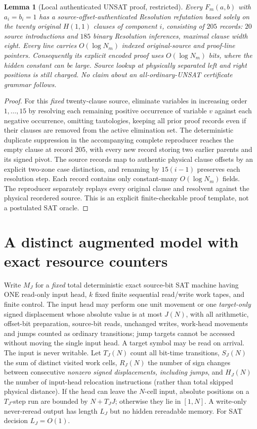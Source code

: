 \documentclass[11pt]{article}
\newtheorem{lemma}[theorem]{Lemma}
\begin{document}
\begin{lemma}[Local authenticated UNSAT proof, restricted]\label{lem:local}
Every $F_m(a,b)$ with $a_i=b_i=1$ has a source-offset-authenticated Resolution refutation based solely on the twenty original $H(1,1)$ clauses of component $i$, consisting of $205$ records: $20$ source introductions and $185$ binary Resolution inferences, maximal clause width eight. Every line carries $O(\log N_m)$ indexed original-source and proof-line pointers. Consequently its explicit encoded proof uses $O(\log N_m)$ bits, where the hidden constant can be large. Source lookup at physically separated left and right positions is still charged. No claim about an all-ordinary-UNSAT certificate grammar follows.
\end{lemma}
\begin{proof}
For this \emph{fixed} twenty-clause source, eliminate variables in increasing order $1,\ldots,15$ by resolving each remaining positive occurrence of variable $v$ against each negative occurrence, omitting tautologies, keeping all prior proof records even if their clauses are removed from the active elimination set. The deterministic duplicate suppression in the accompanying complete reproducer reaches the empty clause at record 205, with every new record storing two earlier parents and its signed pivot. The source records map to authentic physical clause offsets by an explicit two-zone case distinction, and renaming by $15(i-1)$ preserves each resolution step. Each record contains only constant-many $O(\log N_m)$ fields. The reproducer separately replays every original clause and resolvent against the physical reordered source. This is an explicit finite-checkable proof template, not a postulated SAT oracle.\end{proof}

\section{A distinct augmented model with exact resource counters}
Write $M_J$ for a \emph{fixed} total deterministic exact source-bit SAT machine having ONE read-only input head, $k$ fixed finite sequential read/write work tapes, and finite control. The input head may perform one unit movement or one \emph{target-only} signed displacement whose absolute value is at most $J(N)$, with all arithmetic, offset-bit preparation, source-bit reads, unchanged writes, work-head movements and jumps counted as ordinary transitions; jump targets cannot be accessed without moving the single input head. A target symbol may be read on arrival. The input is never writable. Let $T_J(N)$ count all bit-time transitions, $S_J(N)$ the sum of distinct visited work cells, $R_J(N)$ the number of sign changes between consecutive \emph{nonzero signed displacements, including jumps}, and $H_J(N)$ the number of input-head relocation instructions (rather than total skipped physical distance). If the head can leave the $N$-cell input, absolute positions on a $T_J$-step run are bounded by $N+T_JJ$; otherwise they lie in $[1,N]$. A write-only never-reread output has length $L_J$ but no hidden rereadable memory. For SAT decision $L_J=O(1)$.
\end{document}

